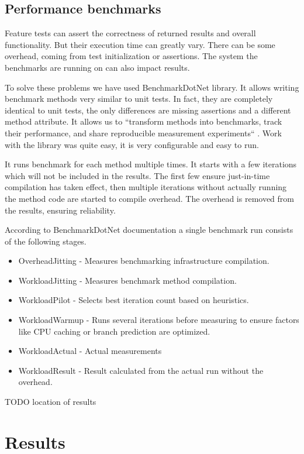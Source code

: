 \subsection{Performance benchmarks}
Feature tests can assert the correctness of returned results and overall functionality. But their execution time can greatly vary. There can be some overhead, coming from test initialization or assertions. The system the benchmarks are running on can also impact results.

To solve these problems we have used BenchmarkDotNet library\cite{BenchmarkDotNet}. It allows writing benchmark methods very similar to unit tests. In fact, they are completely identical to unit tests, the only differences are missing assertions and a different method attribute. It allows us to ``transform methods into benchmarks, track their performance, and share reproducible measurement experiments`` \cite{BenchmarkDotNet}. Work with the library was quite easy, it is very configurable and easy to run. 



It runs benchmark for each method multiple times. It starts with a few iterations which will not be included in the results. The first few ensure just-in-time compilation has taken effect, then multiple iterations without actually running the method code are started to compile overhead. The overhead is removed from the results, ensuring reliability. 


According to BenchmarkDotNet documentation\cite{BenchmarkDotNetHow} a single benchmark run consists of the following stages.
\begin{itemize}
    \item OverheadJitting - Measures benchmarking infrastructure compilation.
    \item WorkloadJitting - Measures benchmark method compilation.
    \item WorkloadPilot - Selects best iteration count based on heuristics.
    \item WorkloadWarmup - Runs several iterations before measuring to ensure factors like CPU caching or branch prediction are optimized.
    \item WorkloadActual - Actual measurements
    \item WorkloadResult - Result calculated from the actual run without the overhead.
\end{itemize}

TODO location of results

\section{Results}

